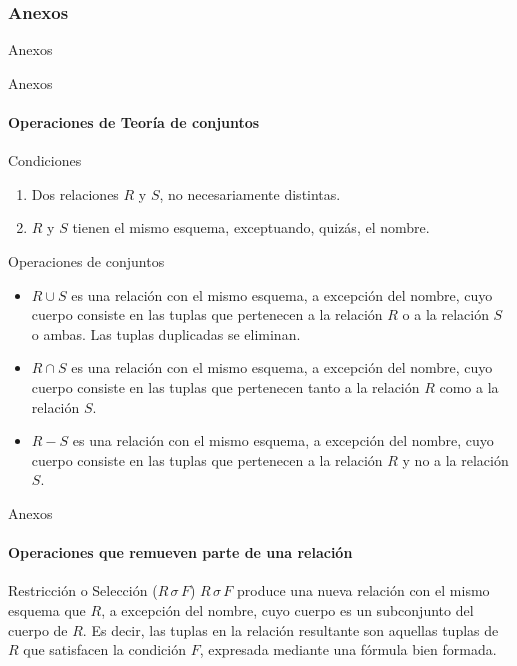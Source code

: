 \begin{frame}
    \frametitle{Anexos}

    \centering
    \Huge \textcolor{blue3}{Anexos}

\end{frame}


\begin{frame}{Anexos}
    \framesubtitle{Operaciones de Teor\'ia de conjuntos}

    \begin{block}{Condiciones}
        \begin{enumerate}
            \item  Dos relaciones $R$ y $S$, no necesariamente distintas.
            \item $R$ y $S$ tienen el mismo esquema, exceptuando, quiz\'as, el nombre.
        \end{enumerate}
    \end{block}

    \begin{block}{Operaciones de conjuntos}
        \begin{itemize}
            \item $R \cup S$ es una relaci\'on con el mismo esquema, a excepci\'on del nombre, cuyo
            cuerpo consiste en las tuplas que pertenecen a la relaci\'on $R$ o a la relaci\'on $S$
            o ambas. Las tuplas duplicadas se eliminan.
            \item $R \cap S$ es una relaci\'on con el mismo esquema, a excepci\'on del nombre, cuyo
            cuerpo consiste en las tuplas que pertenecen tanto a la relaci\'on $R$ como a la relaci\'on $S$.
            \item $R - S$ es una relaci\'on con el mismo esquema, a excepci\'on del nombre, cuyo cuerpo
            consiste en las tuplas que pertenecen a la relaci\'on $R$ y no a la relaci\'on $S$.
        \end{itemize}
        
    \end{block}
\end{frame}

\begin{frame}{Anexos}
    \framesubtitle{Operaciones que remueven parte de una relaci\'on}

    \begin{block}{Restricci\'on o Selecci\'on ($R \,\sigma\, F$)}
        $R \,\sigma\,F$ produce una nueva relaci\'on con el mismo
        esquema que $R$, a excepci\'on del nombre, cuyo cuerpo
        es un subconjunto del cuerpo de $R$. Es decir, las tuplas en la relaci\'on
        resultante son aquellas tuplas de $R$ que satisfacen la condici\'on $F$, expresada
        mediante una f\'ormula bien formada.
    \end{block}    
\end{frame}

